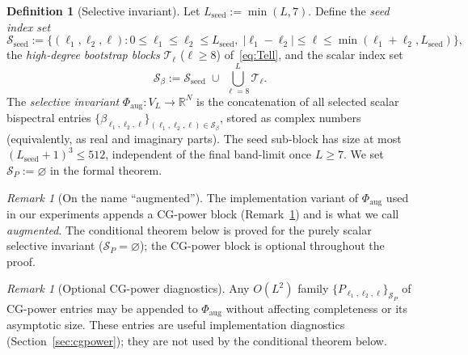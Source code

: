 \documentclass[11pt]{article}
\theoremstyle{plain}
\theoremstyle{definition}
\newtheorem{definition}[theorem]{Definition}
\theoremstyle{remark}
\newtheorem{remark}[theorem]{Remark}
\newcommand{\R}{\mathbb{R}}
\newcommand{\abs}[1]{\lvert #1 \rvert}
\newcommand{\Sb}{\mathcal{S}_\beta}
\newcommand{\Sseed}{\mathcal{S}_{\mathrm{seed}}}
\newcommand{\SP}{\mathcal{S}_P}
\newcommand{\Phiaug}{\Phi_{\mathrm{aug}}}
\begin{document}
\begin{definition}[Selective invariant]\label{def:Phi-aug}
Let $L_{\mathrm{seed}}:=\min(L,7)$. Define the \emph{seed index set}
\[
  \Sseed := \{(\ell_1,\ell_2,\ell):
    0\le\ell_1\le\ell_2\le L_{\mathrm{seed}},\;
    \abs{\ell_1-\ell_2}\le\ell\le\min(\ell_1+\ell_2,L_{\mathrm{seed}})\},
\]
the \emph{high-degree bootstrap blocks}
$\mathcal{T}_\ell$ ($\ell\ge8$) of~\eqref{eq:Tell}, and the scalar
index set
\[
  \Sb := \Sseed \;\cup\; \bigcup_{\ell=8}^L \mathcal{T}_\ell .
\]
The \emph{selective invariant} $\Phiaug:V_L\to\R^N$ is the
concatenation of all selected scalar bispectral entries
$\{\beta_{\ell_1,\ell_2,\ell}\}_{(\ell_1,\ell_2,\ell)\in\Sb}$, stored
as complex numbers (equivalently, as real and imaginary parts). The
seed sub-block has size at most $(L_{\mathrm{seed}}{+}1)^3\le 512$,
independent of the final band-limit once $L\ge7$. We set
$\SP:=\varnothing$ in the formal theorem.
\end{definition}

\begin{remark}[On the name ``augmented'']\label{rem:augmented-name}
The implementation variant of $\Phiaug$ used in our experiments
appends a CG-power block (Remark~\ref{rem:cg-optional}) and is what we
call \emph{augmented}. The conditional theorem below is proved for the
purely scalar selective invariant ($\SP=\varnothing$); the CG-power
block is optional throughout the proof.
\end{remark}

\begin{remark}[Optional CG-power diagnostics]
\label{rem:cg-optional}
Any $O(L^2)$ family $\{P_{\ell_1,\ell_2,\ell}\}_{\SP}$ of CG-power
entries may be appended to $\Phiaug$ without affecting completeness or
its asymptotic size. These entries are useful implementation
diagnostics (Section~\ref{sec:cgpower}); they are not used by the
conditional theorem below.
\end{remark}
\end{document}
